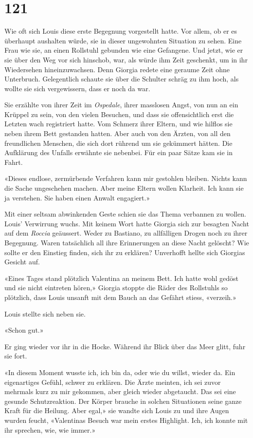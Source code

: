 \chapter{121}



Wie oft sich Louis diese erste Begegnung vorgestellt hatte. Vor allem, ob er es überhaupt aushalten würde, sie in dieser ungewohnten Situation zu sehen. Eine Frau wie sie, an einen Rollstuhl gebunden wie eine Gefangene. 
Und jetzt, wie er sie über den Weg vor sich hinschob, war, als würde ihm
Zeit geschenkt, um in ihr Wiedersehen hineinzuwachsen. Denn Giorgia
redete eine geraume Zeit ohne Unterbruch. Gelegentlich schaute sie über
die Schulter schräg zu ihm hoch, als wollte sie sich vergewissern, dass
er noch da war.

Sie erzählte von ihrer Zeit im \emph{Ospedale}, ihrer masslosen Angst,
von nun an ein Krüppel zu sein, von den vielen Besuchen, und dass sie
offensichtlich erst die Letzten wach registriert hatte. Vom Schmerz
ihrer Eltern, und wie hilflos sie neben ihrem Bett gestanden hatten.
Aber auch von den Ärzten, von all den freundlichen Menschen, die sich
dort rührend um sie gekümmert hätten. Die Aufklärung des Unfalls
erwähnte sie nebenbei. Für ein paar Sätze kam sie in Fahrt.

«Dieses endlose, zermürbende Verfahren kann mir gestohlen
bleiben. Nichts kann die Sache ungeschehen machen. Aber meine
Eltern wollen Klarheit. Ich kann sie ja verstehen. Sie haben einen
Anwalt engagiert.»

Mit einer seltsam abwinkenden Geste schien sie das Thema verbannen zu
wollen.
Louis’ Verwirrung wuchs. Mit keinem Wort hatte Giorgia sich zur besagten
Nacht auf dem \emph{Roccia} geäussert. Weder zu Bastiano, zu allfälligen
Drogen noch zu ihrer Begegnung. Waren tatsächlich all ihre Erinnerungen
an diese Nacht gelöscht?
Wie sollte er den Einstieg finden, sich ihr zu erklären?
Unverhofft hellte sich Giorgias Gesicht auf.

«Eines Tages stand plötzlich Valentina an meinem Bett. Ich hatte wohl
gedöst und sie nicht eintreten hören,» Giorgia stoppte die Räder des
Rollstuhls so plötzlich, dass Louis unsanft mit dem Bauch an das Gefährt
stiess, «verzeih.»

Louis stellte sich neben sie.

«Schon gut.»

Er ging wieder vor ihr in die Hocke. Während ihr Blick über das Meer glitt, fuhr sie fort.

«In diesem Moment wusste ich, ich bin da, oder wie du willst, wieder da. Ein eigenartiges Gefühl,
schwer zu erklären. Die Ärzte meinten, ich sei zuvor mehrmals kurz zu
mir gekommen, aber gleich wieder abgetaucht. Das sei eine gesunde
Schutzreaktion. Der Körper brauche in solchen Situationen seine ganze
Kraft für die Heilung. Aber egal,» sie wandte sich Louis zu und ihre
Augen wurden feucht, «Valentinas Besuch war mein erstes Highlight. Ich,
ich konnte mit ihr sprechen, wie, wie immer.»

